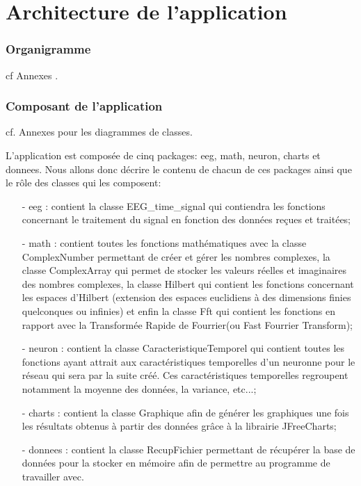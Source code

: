 \part{Architecture de l'application} %
\label{prt:architecture_ _de_ _l_'_application_}
	\section{Organigramme} %
	cf Annexes .
		


	\section{Composant de l'application} %
	\label{sec:composant_de_l_application}
	 cf. Annexes pour les diagrammes de classes.

	L'application est composée de cinq packages: eeg, math, neuron, charts et donnees. Nous allons donc décrire le contenu de chacun de ces packages ainsi que le rôle des classes qui les composent:
	\begin{itemize}
		
	\item [-] eeg :  contient la classe EEG\_time\_signal qui contiendra les fonctions concernant le traitement du signal en fonction des données reçues et traitées;
	\item [-] math :  contient toutes les fonctions mathématiques avec la classe ComplexNumber permettant de créer et gérer les nombres complexes, la classe ComplexArray qui permet de stocker les valeurs réelles et imaginaires des nombres complexes, la classe Hilbert qui contient les fonctions concernant les espaces d'Hilbert (extension des espaces euclidiens à des dimensions finies quelconques ou infinies) et enfin la classe Fft qui contient les fonctions en rapport avec la Transformée Rapide de Fourrier(ou Fast Fourrier Transform);
	\item [-] neuron : contient la classe CaracteristiqueTemporel qui contient toutes les fonctions ayant attrait aux caractéristiques temporelles d'un neuronne pour le réseau qui sera par la suite créé. Ces caractéristiques temporelles regroupent notamment la moyenne des données, la variance, etc...;
	\item [-] charts : contient la classe Graphique afin de générer les graphiques une fois les résultats obtenus à partir des données grâce à la librairie JFreeCharts;
	\item [-] donnees : contient la classe RecupFichier permettant de récupérer la base de données pour la stocker en mémoire afin de permettre au programme de travailler avec.
	
	\end{itemize}
	
